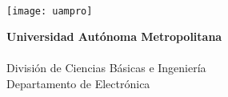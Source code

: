 \documentclass[10pt,letterpaper]{article}
\begin{document}
 

\begin{minipage}[b]{0.5\textwidth}
	{\LARGE {}}\\
	{}
\end{minipage}
\hfill
\begin{minipage}[b]{0.15\textwidth}
	\begin{flushright}
		\texttt{[image: uampro]}
	\end{flushright}
\end{minipage}
\begin{minipage}[b]{0.24\textwidth}
		\scriptsize
		\textbf{Universidad Autónoma Metropolitana}\\ %
		\\
		División de Ciencias Básicas e Ingeniería\\ %
		Departamento de Electrónica
\end{minipage}

\vspace{0.2cm} 
\end{document}
